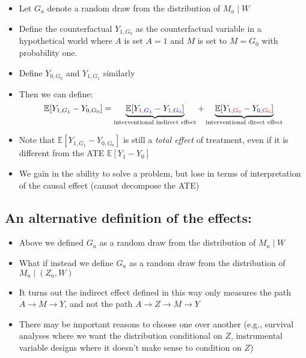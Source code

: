 \documentclass[
  12pt,
]{book}
\providecommand{\tightlist}{%
  \setlength{\itemsep}{0pt}\setlength{\parskip}{0pt}}
\theoremstyle{definition}
\theoremstyle{definition}
\theoremstyle{definition}
\newcommand{\E}{\mathbb{E}}
\newcommand{\1}{\mathbbm{1}}
\begin{document}
\begin{itemize}
\tightlist
\item
  Let \(G_a\) denote a random draw from the distribution of \(M_a \mid W\)
\item
  Define the counterfactual \(Y_{1,G_0}\) as the counterfactual
  variable in a hypothetical world where \(A\) is set \(A=1\) and \(M\) is
  set to \(M=G_0\) with probability one.
\item
  Define \(Y_{0,G_0}\) and \(Y_{1,G_1}\) similarly
\item
  Then we can define:
  \begin{equation*}
  \E[Y_{1,G_1} - Y_{0,G_0}] = \underbrace{\E[Y_{\color{red}{1},\color{blue}{G_1}} -
    Y_{\color{red}{1},\color{blue}{G_0}}]}_{\text{interventional indirect effect}} +
    \underbrace{\E[Y_{\color{blue}{1},\color{red}{G_0}} -
    Y_{\color{blue}{0},\color{red}{G_0}}]}_{\text{interventional direct effect}}
  \end{equation*}
\item
  Note that \(\E[Y_{1,G_1} - Y_{0,G_0}]\) is still a \emph{total effect} of treatment,
  even if it is different from the ATE \(\E[Y_{1} - Y_{0}]\)
\item
  We gain in the ability to solve a problem, but lose in terms of interpretation
  of the causal effect (cannot decompose the ATE)
\end{itemize}

\hypertarget{an-alternative-definition-of-the-effects}{%
\subsection{An alternative definition of the effects:}\label{an-alternative-definition-of-the-effects}}

\begin{itemize}
\tightlist
\item
  Above we defined \(G_a\) as a random draw from the distribution of \(M_a \mid W\)
\item
  What if instead we define \(G_a\) as a random draw from the distribution of \(M_a \mid (Z_a,W)\)
\item
  It turns out the indirect effect defined in this way only measures the path
  \(A\rightarrow M \rightarrow Y\), and not the path \(A\rightarrow Z\rightarrow M \rightarrow Y\)
\item
  There may be important reasons to choose one over another (e.g., survival
  analyses where we want the distribution conditional on \(Z\), instrumental
  variable designs where it doesn't make sense to condition on \(Z\))
\end{itemize}
\end{document}
